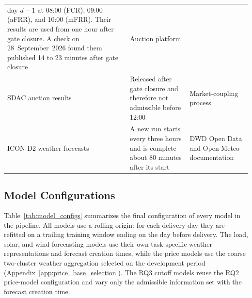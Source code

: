 \begin{table}[H]
\begin{tabular}{@{}>{\raggedright\arraybackslash}p{}
                  >{\raggedright\arraybackslash}p{}
                  >{\raggedright\arraybackslash}p{}@{}}
      day \(d-1\) at 08:00 (FCR), 09:00 (aFRR), and 10:00 (mFRR). Their
      results are used from one hour after gate closure. A check on
      28~September~2026 found them published 14 to 23 minutes after gate
      closure
    & Auction platform \cite{regelleistungNet2026} \\
    \addlinespace
    SDAC auction results
    & Released after gate closure and therefore not admissible before
      12:00
    & Market-coupling process \cite{epexSpotMarketCoupling} \\
    \addlinespace
    \mbox{ICON-D2} weather forecasts
    & A new run starts every three hours and is complete about 80 minutes after
      its start
    & DWD Open Data \cite{dwdIconForecastData} and Open-Meteo documentation
      \cite{openMeteoForecastApi} \\
    \bottomrule
  \end{tabular}
\end{table}

\FloatBarrier

\subsection{Model Configurations}
\label{app:model_configs}

Table~\ref{tab:model_configs} summarizes the final configuration of every model
in the pipeline. All models use a rolling origin: for each delivery day they are
refitted on a trailing training window ending on the day before delivery. The
load, solar, and wind forecasting models use their own task-specific weather
representations and forecast creation times, while the price models use the
coarse two-cluster weather aggregation selected on the development period
(Appendix~\ref{app:price_base_selection}). The RQ3 cutoff models reuse the RQ2
price-model configuration and vary only the admissible information set with the
forecast creation time.

